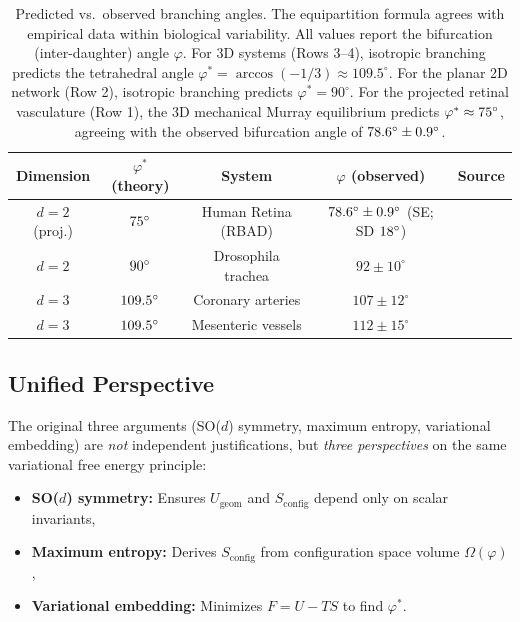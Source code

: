 \documentclass[11pt,a4paper]{article}
\theoremstyle{remark}
\begin{document}
\begin{table}[H]
\centering
\caption{Predicted vs.\ observed branching angles. The equipartition formula
agrees with empirical data within biological variability. All values report the
bifurcation (inter-daughter) angle $\varphi$. For 3D systems (Rows 3--4), isotropic branching
predicts the tetrahedral angle $\varphi^* = \arccos(-1/3) \approx 109.5^\circ$. For the
planar 2D network (Row 2), isotropic branching predicts $\varphi^* = 90^\circ$. For the
projected retinal vasculature (Row 1), the 3D mechanical Murray equilibrium predicts
$\varphi^* \approx 75^\circ$, agreeing with the observed bifurcation angle of
$78.6^\circ \pm 0.9^\circ$.}
\label{tab:branching_angles}
\smallskip
\begin{tabular}{ccccc}
\toprule
Dimension & $\varphi^*$ (theory) & System & $\varphi$ (observed) & Source \\
\midrule
$d = 2$ (proj.) & $75^\circ$ & Human Retina (RBAD) & $78.6^\circ \pm 0.9^\circ$ (SE; SD $18^\circ$) & \cite{luo2017} \\
$d = 2$ & $90^\circ$ & Drosophila trachea & $92 \pm 10^\circ$ & \cite{ghabrial2003} \\
$d = 3$ & $109.5^\circ$ & Coronary arteries & $107 \pm 12^\circ$ & \cite{kassab1993} \\
$d = 3$ & $109.5^\circ$ & Mesenteric vessels & $112 \pm 15^\circ$ & \cite{zamir1999} \\
\bottomrule
\end{tabular}
\end{table}

\subsection{Unified Perspective}

The original three arguments (SO($d$) symmetry, maximum entropy, variational
embedding) are \emph{not} independent justifications, but \emph{three
perspectives} on the same variational free energy principle:

\begin{itemize}
    \item
\textbf{SO($d$) symmetry:} Ensures $U_{\mathrm{geom}}$ and $S_{\mathrm{config}}$
depend only on scalar invariants,
    \item
\textbf{Maximum entropy:} Derives $S_{\mathrm{config}}$ from configuration space
volume $\Omega(\varphi)$,
    \item
\textbf{Variational embedding:} Minimizes $F = U - TS$ to find $\varphi^*$.
\end{itemize}
\end{document}
